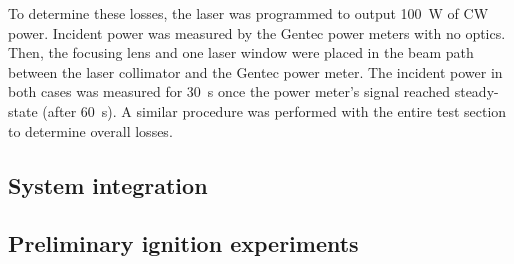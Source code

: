                 To determine these losses, the laser was programmed to output \qty{100}{W} of CW power. Incident power was measured by the Gentec power meters with no optics. Then, the focusing lens and one laser window were placed in the beam path between the laser collimator and the Gentec power meter. The incident power in both cases was measured for 30~s once the power meter's signal reached steady-state (after 60~s). A similar procedure was performed with the entire test section to determine overall losses. 
                

        \subsection{System integration}
        \subsection{Preliminary ignition experiments} \label{sec:design_ignitiontest}